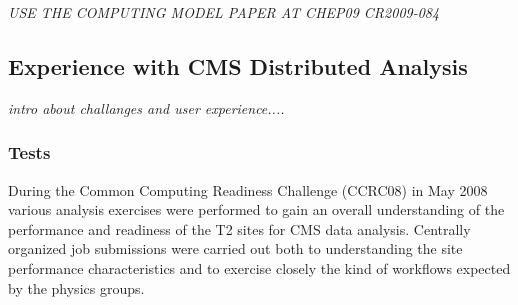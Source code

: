 \emph{USE THE COMPUTING MODEL PAPER AT CHEP09 CR2009-084}

\subsection{Experience with CMS Distributed Analysis}
\label{sec:4_3}
\emph{intro about challanges and user experience....}

\subsubsection{Tests}
\label{sec:4_3_1}
During the Common Computing Readiness Challenge (CCRC08) in May 2008
various analysis exercises were performed to gain an overall understanding 
of the performance and readiness of the T2 sites for CMS data analysis.
Centrally organized job submissions were carried out both to understanding the site performance characteristics and to exercise closely the kind of workflows
expected by the physics groups.
